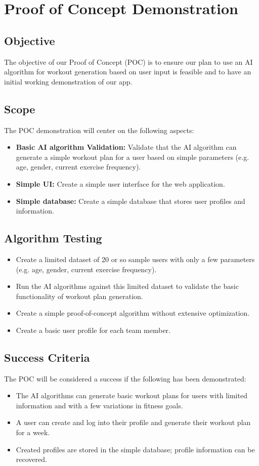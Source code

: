 \documentclass{article}
\begin{document}
	\section{Proof of Concept Demonstration}

	\subsection{Objective}
	The objective of our Proof of Concept (POC) is to ensure our plan to use an AI algorithm for workout generation based on user input is feasible and to have an initial working demonstration of our app.

	\subsection{Scope}
	The POC demonstration will center on the following aspects:
	\begin{itemize}
		\item \textbf{Basic AI algorithm Validation:} Validate that the AI algorithm can generate a simple workout plan for a user based on simple parameters (e.g. age, gender, current exercise frequency).
		\item \textbf{Simple UI:} Create a simple user interface for the web application.
		\item \textbf{Simple database:} Create a simple database that stores user profiles and information.
	\end{itemize}

	\subsection{Algorithm Testing}
	\begin{itemize}
		\item Create a limited dataset of 20 or so sample users with only a few parameters (e.g. age, gender, current exercise frequency).
		\item Run the AI algorithms against this limited dataset to validate the basic functionality of workout plan generation.
		\item Create a simple proof-of-concept algorithm without extensive optimization.
		\item Create a basic user profile for each team member.
	\end{itemize}

	\subsection{Success Criteria}
	The POC will be considered a success if the following has been demonstrated:
	\begin{itemize}
		\item The AI algorithms can generate basic workout plans for users with limited information and with a few variations in fitness goals.
		\item A user can create and log into their profile and generate their workout plan for a week.
		\item Created profiles are stored in the simple database; profile information can be recovered.
	\end{itemize}
\end{document}
